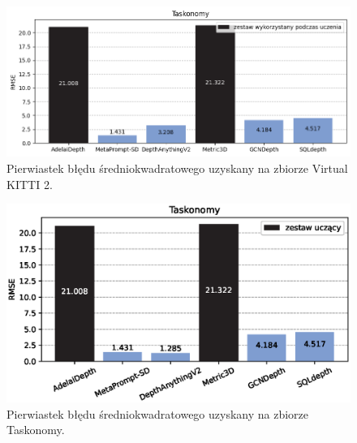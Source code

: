 \begin{figure}[H]
    \centering
    \includegraphics{plots/rmse/6}
    \caption{Pierwiastek błędu średniokwadratowego uzyskany na zbiorze Virtual KITTI 2.}
    \label{fig:rmse_6}
\end{figure}
\begin{figure}[H]
    \centering
    \includegraphics{plots/rmse/7}
    \caption{Pierwiastek błędu średniokwadratowego uzyskany na zbiorze Taskonomy.}
    \label{fig:rmse_7}
\end{figure}


